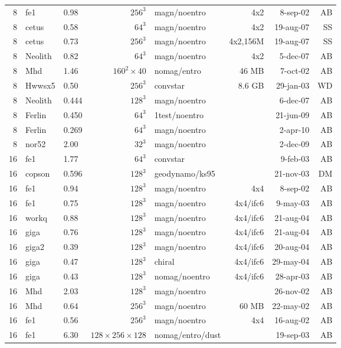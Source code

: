 \documentclass[\mydriver,12pt,twoside,notitlepage,a4paper]{article}
\begin{document}
\begin{center}
\begin{small}
\begin{longtable}{rllrlrrr}
   8 & fe1   & 0.98 & $256^3$ & magn/noentro &  4x2   &  8-sep-02 & AB \\
   8 & cetus & 0.58 & $ 64^3$ & magn/noentro &4x2     & 19-aug-07 & SS \\
   8 & cetus & 0.73 & $256^3$ & magn/noentro &4x2,156M& 19-aug-07 & SS \\
   8 &Neolith& 0.82 &  $64^3$ & magn/noentro &4x2     &  5-dec-07 & AB \\
   8 & Mhd   & 1.46 & $160^2\times40$
                              & nomag/entro &  46 MB &  7-oct-02 & AB \\
   8 & Hwwsx5& 0.50 & $256^3$ & convstar     & 8.6 GB & 29-jan-03 & WD \\
   8 &Neolith& 0.444& $128^3$ & magn/noentro &        &  6-dec-07 & AB \\
   8 &Ferlin & 0.450&  $64^3$ &1test/noentro &        & 21-jun-09 & AB \\
   8 &Ferlin & 0.269&  $64^3$ & magn/noentro &        &  2-apr-10 & AB \\
   8 &nor52  & 2.00 &  $32^3$ & magn/noentro &        &  2-dec-09 & AB \\
  16 & fe1   & 1.77 &  $64^3$ & convstar     &        &  9-feb-03 & AB \\
  16 & copson& 0.596& $128^3$ & geodynamo/ks95 &      & 21-nov-03 & DM \\
  16 & fe1   & 0.94 & $128^3$ & magn/noentro &  4x4   &  8-sep-02 & AB \\
  16 & fe1   & 0.75 & $128^3$ & magn/noentro &4x4/ifc6&  9-may-03 & AB \\
  16 & workq & 0.88 & $128^3$ & magn/noentro &4x4/ifc6& 21-aug-04 & AB \\
  16 & giga  & 0.76 & $128^3$ & magn/noentro &4x4/ifc6& 21-aug-04 & AB \\
  16 & giga2 & 0.39 & $128^3$ & magn/noentro &4x4/ifc6& 20-aug-04 & AB \\
  16 & giga  & 0.47 & $128^3$ & chiral       &4x4/ifc6& 29-may-04 & AB \\
  16 & giga  & 0.43 & $128^3$ & nomag/noentro&4x4/ifc6& 28-apr-03 & AB \\
  16 & Mhd   & 2.03 & $128^3$ & magn/noentro &        & 26-nov-02 & AB \\
  16 & Mhd   & 0.64 & $256^3$ & magn/noentro &  60 MB & 22-may-02 & AB \\
  16 & fe1   & 0.56 & $256^3$ & magn/noentro &  4x4   & 16-aug-02 & AB \\
  16 & fe1   & 6.30 & $128\!\times\!256\!\times\!128$
                              & nomag/entro/dust &    & 19-sep-03 & AB \\

\end{longtable}
\end{small}
\end{center}
\end{document}
